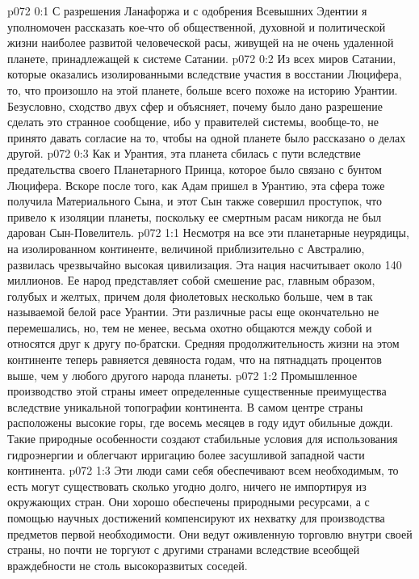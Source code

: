 \author{Мелхиседек}
\vs p072 0:1 С разрешения Ланафоржа и с одобрения Всевышних Эдентии я уполномочен рассказать кое\hyp{}что об общественной, духовной и политической жизни наиболее развитой человеческой расы, живущей на не очень удаленной планете, принадлежащей к системе Сатании.
\vs p072 0:2 Из всех миров Сатании, которые оказались изолированными вследствие участия в восстании Люцифера, то, что произошло на этой планете, больше всего похоже на историю Урантии. Безусловно, сходство двух сфер и объясняет, почему было дано разрешение сделать это странное сообщение, ибо у правителей системы, вообще\hyp{}то, не принято давать согласие на то, чтобы на одной планете было рассказано о делах другой.
\vs p072 0:3 Как и Урантия, эта планета сбилась с пути вследствие предательства своего Планетарного Принца, которое было связано с бунтом Люцифера. Вскоре после того, как Адам пришел в Урантию, эта сфера тоже получила Материального Сына, и этот Сын также совершил проступок, что привело к изоляции планеты, поскольку ее смертным расам никогда не был дарован Сын\hyp{}Повелитель.
\vs p072 1:1 Несмотря на все эти планетарные неурядицы, на изолированном континенте, величиной приблизительно с Австралию, развилась чрезвычайно высокая цивилизация. Эта нация насчитывает около 140 миллионов. Ее народ представляет собой смешение рас, главным образом, голубых и желтых, причем доля фиолетовых несколько больше, чем в так называемой белой расе Урантии. Эти различные расы еще окончательно не перемешались, но, тем не менее, весьма охотно общаются между собой и относятся друг к другу по\hyp{}братски. Средняя продолжительность жизни на этом континенте теперь равняется девяноста годам, что на пятнадцать процентов выше, чем у любого другого народа планеты.
\vs p072 1:2 Промышленное производство этой страны имеет определенные существенные преимущества вследствие уникальной топографии континента. В самом центре страны расположены высокие горы, где восемь месяцев в году идут обильные дожди. Такие природные особенности создают стабильные условия для использования гидроэнергии и облегчают ирригацию более засушливой западной части континента.
\vs p072 1:3 Эти люди сами себя обеспечивают всем необходимым, то есть могут существовать сколько угодно долго, ничего не импортируя из окружающих стран. Они хорошо обеспечены природными ресурсами, а с помощью научных достижений компенсируют их нехватку для производства предметов первой необходимости. Они ведут оживленную торговлю внутри своей страны, но почти не торгуют с другими странами вследствие всеобщей враждебности не столь высокоразвитых соседей.
